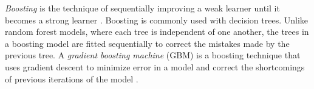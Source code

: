 \documentclass[final,onefignum,onetabnum]{siuro210301}
\begin{document}

	\textit{Boosting} is the technique of sequentially improving a weak learner until it becomes a strong learner \cite{schapire1990strength}. Boosting is commonly used with decision trees. Unlike random forest models, where each tree is independent of one another, the trees in a boosting model are fitted sequentially to correct the mistakes made by the previous tree. A \textit{gradient boosting machine} (GBM) is a boosting technique that uses gradient descent to minimize error in a model and correct the shortcomings of previous iterations of the model \cite{friedman2001greedy}. 
	
\end{document}
